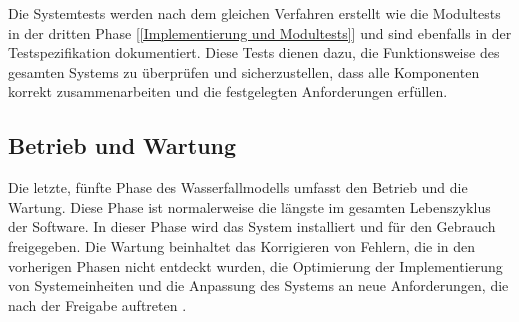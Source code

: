 Die Systemtests werden nach dem gleichen Verfahren erstellt wie die Modultests in der dritten Phase [\autoref{Implementierung und Modultests}] und sind ebenfalls 
in der Testspezifikation dokumentiert. Diese Tests dienen dazu, die Funktionsweise des gesamten Systems zu überprüfen und sicherzustellen, dass alle 
Komponenten korrekt zusammenarbeiten und die festgelegten Anforderungen erfüllen.

\subsection{Betrieb und Wartung}  \label{Betrieb und Wartung}

Die letzte, fünfte Phase des Wasserfallmodells umfasst den Betrieb und die Wartung. Diese Phase ist normalerweise die längste im gesamten Lebenszyklus 
der Software. In dieser Phase wird das System installiert und für den Gebrauch freigegeben. Die Wartung beinhaltet das Korrigieren von Fehlern, die in
den vorherigen Phasen nicht entdeckt wurden, die Optimierung der Implementierung von Systemeinheiten und die Anpassung des Systems an neue Anforderungen, 
die nach der Freigabe auftreten \cite{Sommerville10}.